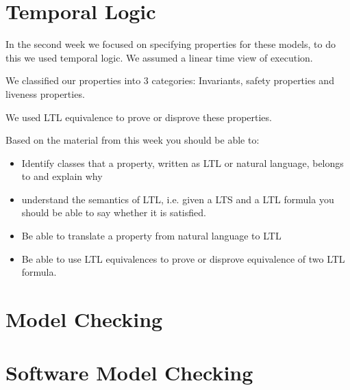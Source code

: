 \documentclass{article}
\begin{document}
    \section{Temporal Logic}

    In the second week we focused on specifying properties for these models, to do this we used temporal logic. We assumed a linear time view of execution.

    We classified our properties into 3 categories: Invariants, safety properties and liveness properties. 

    We used LTL equivalence to prove or disprove these properties.

    Based on the material from this week you should be able to:

    \begin{itemize}
        \item Identify classes that a property, written as LTL or natural language, belongs to and explain why
        \item understand the semantics of LTL, i.e. given a LTS and a LTL formula you should be able to say whether it is satisfied.
        \item Be able to translate a property from natural language to LTL
        \item Be able to use LTL equivalences to prove or disprove equivalence of two LTL formula.
    \end{itemize}



    \section{Model Checking}%
    \label{sec:model_checking}
    
    
    \section{Software Model Checking}%
    \label{sec:software_model_checking}
\end{document}
